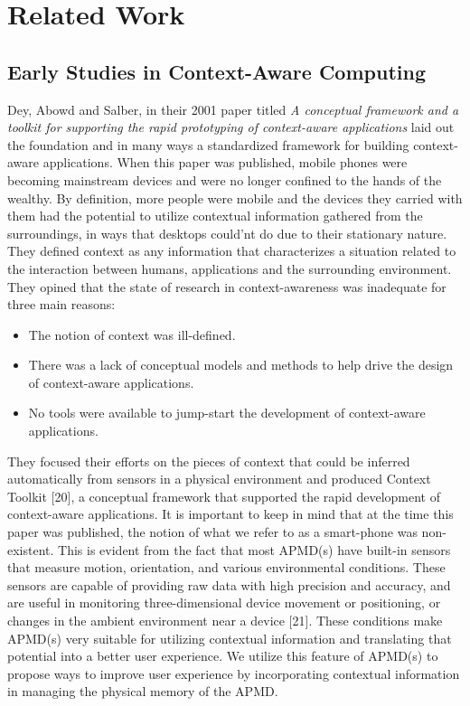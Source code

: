 \documentclass[12pt]{uthesis-v12}  %
\begin{document}


\chapter{Related Work}
	
	\section{Early Studies in Context-Aware Computing}
		Dey, Abowd and Salber, in their 2001 paper titled {\em A conceptual framework and a toolkit for supporting the rapid prototyping of context-aware applications} laid out the foundation and in many ways a standardized framework for building context-aware applications. When this paper was published, mobile phones were becoming mainstream devices and were no longer confined to the hands of the wealthy. By definition, more people were mobile and the devices they carried with them had the potential to utilize contextual information gathered from the surroundings, in ways that desktops could'nt do due to their stationary nature. They defined context as any information that characterizes a situation related to the interaction between humans, applications and the surrounding environment. They opined that the state of research in context-awareness was inadequate for three main reasons:
		
		\begin{itemize}
			\item The notion of context was ill-defined.
			\item There was a lack of conceptual models and methods to help drive the design of context-aware applications.
			\item No tools were available to jump-start the development of context-aware applications.
		\end{itemize}
		
		 They focused their efforts on the pieces of context that could be inferred automatically from sensors in a physical environment and produced Context Toolkit [20], a conceptual framework that supported the rapid development of context-aware applications. It is important to keep in mind that at the time this paper was published, the notion of what we refer to as a smart-phone was non-existent. This is evident from the fact that most APMD(s) have built-in sensors that measure motion, orientation, and various environmental conditions. These sensors are capable of providing raw data with high precision and accuracy, and are useful in monitoring three-dimensional device movement or positioning, or changes in the ambient environment near a device [21]. These conditions make APMD(s) very suitable for utilizing contextual information and translating that potential into a better user experience. We utilize this feature of APMD(s) to propose ways to improve user experience by incorporating contextual information in managing the physical memory of the APMD.		
			
\end{document}
